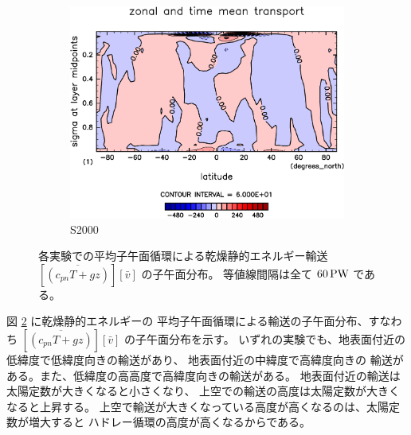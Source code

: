 \documentclass[body]{subfiles}
\begin{document}
\begin{figure}[t]
\begin{subfigure}{.4\textwidth}
		\centering
		\includegraphics[width=\columnwidth]{S2000/MeriHeatTransTest@dryStatEn_M,time=7300:7665-crop-rotate.pdf}
		\caption{S2000}\label{乾燥静的エネルギー平均子午面循環S2000}
	\end{subfigure}
	\caption[各実験での平均子午面循環による乾燥静的エネルギー輸送の子午面分布]{
		各実験での平均子午面循環による乾燥静的エネルギー輸送 \([\overline{(c_{pn}T+gz)}][\bar v]\) の子午面分布。
		等値線間隔は全て \(60\hmu{PW}\) である。
	}\label{乾燥静的エネルギー平均子午面循環}
\end{figure}

図 \ref{乾燥静的エネルギー平均子午面循環} に乾燥静的エネルギーの
平均子午面循環による輸送の子午面分布、すなわち 
\([\overline{(c_{pn}T+gz)}][\bar v]\) の子午面分布を示す。
いずれの実験でも、地表面付近の低緯度で低緯度向きの輸送があり、
地表面付近の中緯度で高緯度向きの
輸送がある。また、低緯度の高高度で高緯度向きの輸送がある。
地表面付近の輸送は太陽定数が大きくなると小さくなり、
上空での輸送の高度は太陽定数が大きくなると上昇する。
上空で輸送が大きくなっている高度が高くなるのは、太陽定数が増大すると
ハドレー循環の高度が高くなるからである。
\end{document}
